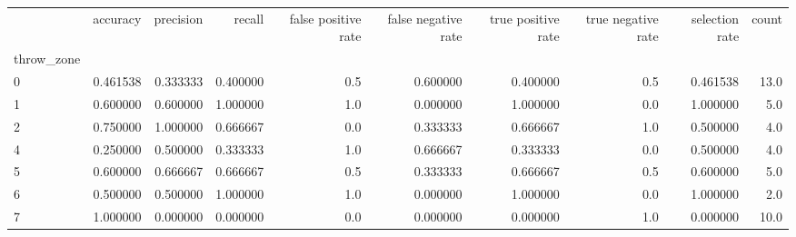 \begin{tabular}{lrrrrrrrrr}
\toprule
{} &  accuracy &  precision &    recall &  false positive rate &  false negative rate &  true positive rate &  true negative rate &  selection rate &  count \\
throw\_zone &           &            &           &                      &                      &                     &                     &                 &        \\
\midrule
0          &  0.461538 &   0.333333 &  0.400000 &                  0.5 &             0.600000 &            0.400000 &                 0.5 &        0.461538 &   13.0 \\
1          &  0.600000 &   0.600000 &  1.000000 &                  1.0 &             0.000000 &            1.000000 &                 0.0 &        1.000000 &    5.0 \\
2          &  0.750000 &   1.000000 &  0.666667 &                  0.0 &             0.333333 &            0.666667 &                 1.0 &        0.500000 &    4.0 \\
4          &  0.250000 &   0.500000 &  0.333333 &                  1.0 &             0.666667 &            0.333333 &                 0.0 &        0.500000 &    4.0 \\
5          &  0.600000 &   0.666667 &  0.666667 &                  0.5 &             0.333333 &            0.666667 &                 0.5 &        0.600000 &    5.0 \\
6          &  0.500000 &   0.500000 &  1.000000 &                  1.0 &             0.000000 &            1.000000 &                 0.0 &        1.000000 &    2.0 \\
7          &  1.000000 &   0.000000 &  0.000000 &                  0.0 &             0.000000 &            0.000000 &                 1.0 &        0.000000 &   10.0 \\
\bottomrule
\end{tabular}
